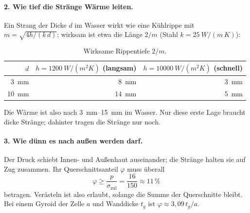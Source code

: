 \documentclass[10pt,a4paper]{article}
\begin{document}
\paragraph{2. Wie tief die Stränge Wärme leiten.} Ein Strang der Dicke $d$ im Wasser wirkt wie eine Kühlrippe mit
$m = \sqrt{4h/(k\,d)}$; wirksam ist etwa die Länge $2/m$ (Stahl $k = \SI{25}{W/(m\,K)}$):
\begin{table}[H]\centering\small
\begin{tabular}{rrr}\toprule
$d$ & $h = \SI{1200}{W/(m^2K)}$ (langsam) & $h = \SI{10000}{W/(m^2K)}$ (schnell)\\\midrule
\SI{3}{mm} & \SI{8}{mm} & \SI{3}{mm}\\
\SI{10}{mm} & \SI{14}{mm} & \SI{5}{mm}\\\bottomrule
\end{tabular}\caption{Wirksame Rippentiefe $2/m$.}\end{table}
Die Wärme ist also nach \SIrange{3}{15}{mm} im Wasser. Nur diese erste Lage braucht dicke Stränge; dahinter tragen
die Stränge nur noch.

\paragraph{3. Wie dünn es nach außen werden darf.} Der Druck schiebt Innen- und Außenhaut auseinander; die Stränge
halten sie auf Zug zusammen. Ihr Querschnittsanteil $\varphi$ muss überall
\[ \varphi \ge \frac{p}{\sigma_\text{zul}} = \frac{16}{150} \approx 11\,\% \]
betragen. Verästeln ist also erlaubt, solange die Summe der Querschnitte bleibt. Bei einem Gyroid der Zelle $a$ und
Wanddicke $t_g$ ist $\varphi \approx 3{,}09\,t_g/a$.
\end{document}
